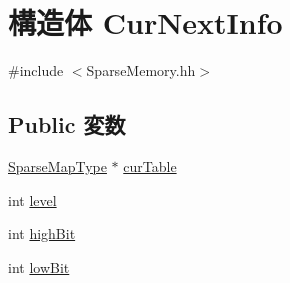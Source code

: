 \hypertarget{structCurNextInfo}{
\section{構造体 CurNextInfo}
\label{structCurNextInfo}
}


{\ttfamily \#include $<$SparseMemory.hh$>$}\subsection*{Public 変数}
\begin{DoxyCompactItemize}
\item 
\hyperlink{SparseMemory_8hh_a93e9b04c329a9452d20206c8e31a4172}{SparseMapType} $\ast$ \hyperlink{structCurNextInfo_ac7a02081ea67fec9f28f80ab2f32076f}{curTable}
\item 
int \hyperlink{structCurNextInfo_acf4d33ee4cff36f69b924471174dcb11}{level}
\item 
int \hyperlink{structCurNextInfo_a37935763846e4f7567926b7718471bd2}{highBit}
\item 
int \hyperlink{structCurNextInfo_a34ee3b3cc8c62038210ed3976c74d9b9}{lowBit}
\end{DoxyCompactItemize}


